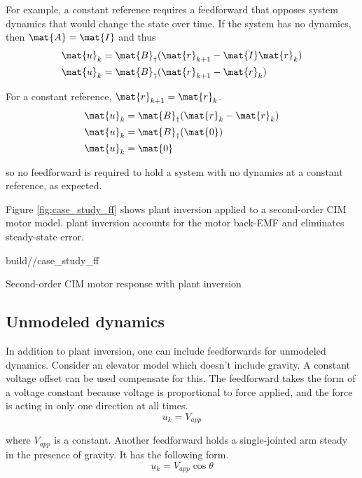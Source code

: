 For example, a constant \gls{reference} requires a feedforward that opposes
\gls{system} dynamics that would change the \gls{state} over time. If the
\gls{system} has no dynamics, then $\mat{A} = \mat{I}$ and thus
\begin{align*}
  \mat{u}_k &= \mat{B}_\dagger (\mat{r}_{k+1} - \mat{I}\mat{r}_k) \\
  \mat{u}_k &= \mat{B}_\dagger (\mat{r}_{k+1} - \mat{r}_k)
\end{align*}

For a constant \gls{reference}, $\mat{r}_{k+1} = \mat{r}_k$.
\begin{align*}
  \mat{u}_k &= \mat{B}_\dagger (\mat{r}_k - \mat{r}_k) \\
  \mat{u}_k &= \mat{B}_\dagger (\mat{0}) \\
  \mat{u}_k &= \mat{0}
\end{align*}

so no feedforward is required to hold a \gls{system} with no dynamics at a
constant \gls{reference}, as expected.

Figure \ref{fig:case_study_ff} shows \gls{plant} inversion applied to a
second-order CIM motor model. \Gls{plant} inversion accounts for the motor
back-EMF and eliminates steady-state error.
\begin{svg}{build/\chapterpath/case_study_ff}
  \caption{Second-order CIM motor response with plant inversion}
  \label{fig:case_study_ff}
\end{svg}

\subsection{Unmodeled dynamics}

In addition to \gls{plant} inversion, one can include feedforwards for unmodeled
dynamics. Consider an elevator model which doesn't include gravity. A constant
voltage offset can be used compensate for this. The feedforward takes the form
of a voltage constant because voltage is proportional to force applied, and the
force is acting in only one direction at all times.
\begin{equation}
  u_k = V_{app}
\end{equation}

where $V_{app}$ is a constant. Another feedforward holds a single-jointed arm
steady in the presence of gravity. It has the following form.
\begin{equation}
  u_k = V_{app} \cos\theta
\end{equation}

